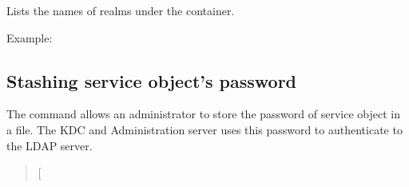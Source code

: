 \documentclass[letterpaper,10pt,english]{sphinxmanual}
\begin{document}
Lists the names of realms under the container.

Example:

%
\begin{sphinxVerbatim}[commandchars=\\\{\}]
    
     
  
\end{sphinxVerbatim}


\subsection{Stashing service object’s password}
\label{\detokenize{admin/database:stashing-service-object-s-password}}\label{\detokenize{admin/database:stash-ldap}}
The {\hyperref[\detokenize{admin/admin_commands/kdb5_ldap_util:kdb5-ldap-util-8}]{}}  command allows an
administrator to store the password of service object in a file.  The
KDC and Administration server uses this password to authenticate to
the LDAP server.
\begin{quote}

{[} \sphinxstyleemphasis{filename}{]}
\end{quote}
\end{document}
